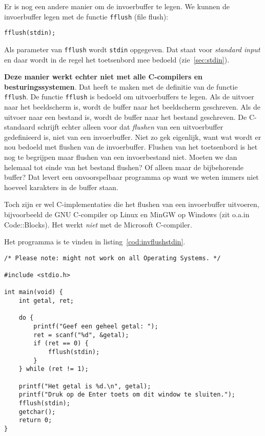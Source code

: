 Er is nog een andere manier om de invoerbuffer te legen. We kunnen de invoerbuffer legen met de functie \texttt{fflush} (file flush):

\hspace*{1em}\texttt{fflush(stdin);}

Als parameter van \texttt{fflush} wordt \texttt{stdin} opgegeven. Dat staat voor \textsl{standard input} en daar wordt in de regel het toetsenbord mee bedoeld (zie~\ref{sec:stdin}).

\textbf{Deze manier werkt echter niet met alle C-compilers en besturingssystemen}. Dat heeft te maken met de definitie van de functie \texttt{fflush}. De functie \texttt{fflush} is bedoeld om uitvoerbuffers te legen. Als de uitvoer naar het beeldscherm is, wordt de buffer naar het beeldscherm geschreven. Als de uitvoer naar een bestand is, wordt de buffer naar het bestand geschreven. De C-standaard schrijft echter alleen voor dat \textsl{flushen} van een uitvoerbuffer gedefinieerd is, niet van een invoerbuffer. Niet zo gek eigenlijk, want wat wordt er nou bedoeld met flushen van de invoerbuffer. Flushen van het toetsenbord is het nog te begrijpen maar flushen van een invoerbestand niet. Moeten we dan helemaal tot einde van het bestand flushen? Of alleen maar de bijbehorende buffer? Dat levert een onvoorspelbaar programma op want we weten immers niet hoeveel karakters in de buffer staan.

Toch zijn er wel C-implementaties die het flushen van een invoerbuffer uitvoeren, bijvoorbeeld de GNU C-compiler op Linux en MinGW op Windows (zit o.a.\@ in Code::Blocks). Het werkt \textsl{niet} met de Microsoft C-compiler.

Het programma is te vinden in listing~\ref{cod:invflushstdin}.

\begin{lstlisting}[caption=Leegmaken van de invoerbuffer van \texttt{stdin}.,label=cod:invflushstdin]
/* Please note: might not work on all Operating Systems. */

#include <stdio.h>

int main(void) {
    int getal, ret;
    
    do {
        printf("Geef een geheel getal: ");
        ret = scanf("%d", &getal);
        if (ret == 0) {
            fflush(stdin);
        }
    } while (ret != 1);

    printf("Het getal is %d.\n", getal);
    printf("Druk op de Enter toets om dit window te sluiten.");
    fflush(stdin);
    getchar();
    return 0;
}
\end{lstlisting}

